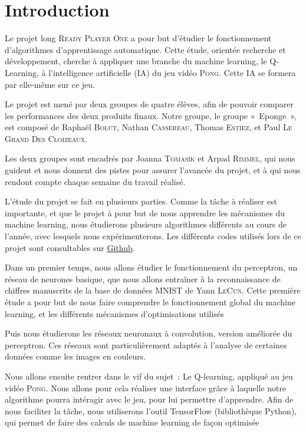 \section*{Introduction}

Le projet long \textsc{Ready Player One} a pour but d’étudier le fonctionnement d’algorithmes d'apprentissage automatique. Cette étude, 
orientée recherche et développement, cherche à appliquer une branche du machine learning, le Q-Learning, à l’intelligence artificielle (IA)
du jeu vidéo \textsc{Pong}. Cette IA se formera par elle-même sur ce jeu.

Le projet est mené par deux groupes de quatre élèves, afin de pouvoir comparer les performances des deux produits finaux. 
Notre groupe, le groupe « Eponge », est composé de Raphaël \textsc{Bolut}, Nathan \textsc{Cassereau}, Thomas \textsc{Estiez}, et 
Paul \textsc{Le Grand Des Cloizeaux}. 

Les deux groupes sont encadrés par Joanna \textsc{Tomasik} et Arpad \textsc{Rimmel}, qui nous guident et nous donnent des pistes
pour assurer l'avancée du projet, et à qui nous rendont compte chaque semaine du travail réalisé.

L’étude du projet se fait en plusieurs parties. Comme la tâche à réaliser est importante, et que le projet à pour but 
de nous apprendre les mécanismes du machine learning, nous étudierons plusieurs algorithmes différents au cours de l’année, avec lesquels nous expérimenterons. 
Les différents codes utilisés lors de ce projet sont consultables sur \href{https://github.com/ready-player-one-supelec}{Github}.

Dans un premier temps, nous allons étudier le fonctionnement du perceptron, un réseau de neurones basique, que nous allons entraîner 
à la reconnaissance de chiffres manuscrits de la base de données MNIST de Yann \textsc{LeCun}. Cette première étude a pour but de nous faire 
comprendre le fonctionnement global du machine learning, et les différents mécanismes d’optimisations utilisés
 
Puis nous étudierons les réseaux neuronaux à convolution, version améliorée du perceptron. Ces réseaux sont particulièrement adaptés à l'analyse
de certaines données comme les images en couleurs.

Nous allons ensuite rentrer dans le vif du sujet : Le Q-learning, appliqué au jeu vidéo \textsc{Pong}. Nous allons pour cela réaliser une 
interface grâce à laquelle notre algorithme pourra intéragir avec le jeu, pour lui permettre d’apprendre. Afin de nous faciliter la tâche, nous 
utiliserons l’outil TensorFlow (bibliothèque Python), qui permet de faire des calculs de machine learning de façon optimisée
